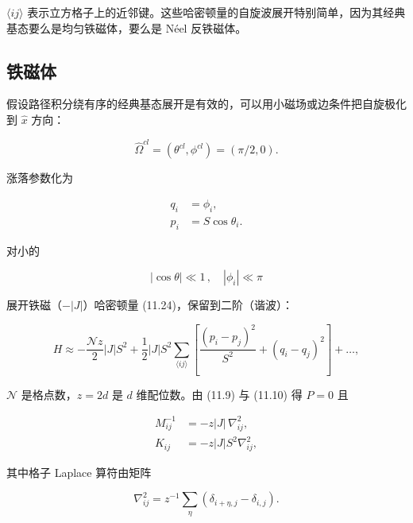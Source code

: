 $\langle ij\rangle$ 表示立方格子上的近邻键。这些哈密顿量的自旋波展开特别简单，因为其经典基态要么是均匀铁磁体，要么是 Néel 反铁磁体。

\subsection{铁磁体}

假设路径积分绕有序的经典基态展开是有效的，可以用小磁场或边条件把自旋极化到 $\hat{x}$ 方向：

\begin{equation*}
\hat {\Omega} ^ {cl} = \left( \theta^ {cl}, \phi^ {cl} \right) = ( \pi / 2, 0 ).
\tag{11.25}
\end{equation*}

涨落参数化为

\begin{align*}
q _ {i} & = \phi _ {i} ,\\
p _ {i} & = S \cos \theta_ {i} .
\tag{11.26}
\end{align*}

对小的

\begin{equation*}
| \cos \theta | \ll 1 \, , \quad | \phi_ {i} | \ll \pi
\tag{11.27}
\end{equation*}

展开铁磁（$-|J|$）哈密顿量 (11.24)，保留到二阶（谐波）：

\begin{equation*}
H \approx - \frac {\mathcal {N} z}{2} | J | S ^ {2} + \frac {1}{2} | J | S ^ {2} \sum_{\langle ij \rangle} \left[ \frac {\left( p _ {i} - p _ {j} \right) ^ {2}}{S ^ {2}} + \left( q _ {i} - q _ {j} \right) ^ {2} \right] + \dots ,
\tag{11.28}
\end{equation*}

$\mathcal{N}$ 是格点数，$z = 2d$ 是 $d$ 维配位数。由 (11.9) 与 (11.10) 得 $P = 0$ 且

\begin{align*}
M _ {ij} ^ {- 1} & = - z | J | \, \nabla_ {ij} ^ {2} ,\\
K _ {ij} & = - z | J | S ^ {2} \nabla_ {ij} ^ {2} ,
\tag{11.29}
\end{align*}

其中格子 Laplace 算符由矩阵

\begin{equation*}
\nabla_ {ij} ^ {2} = z ^ {- 1} \sum_ {\eta} \left( \delta_ {i + \eta, j} - \delta_ {i, j} \right).
\tag{11.30}
\end{equation*}

